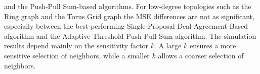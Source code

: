 and the Push-Pull Sum-based algorithms. For low-degree topologies such as the Ring graph and the Torus Grid graph the MSE differences are not as significant, especially between the best-performing Single-Proposal Deal-Agreement-Based algorithm and the Adaptive Threshold Push-Pull Sum algorithm. The simulation results depend mainly on the sensitivity factor $k$. A large $k$ ensures a more sensitive selection of neighbors, while a smaller $k$ allows a coarser selection of neighbors.